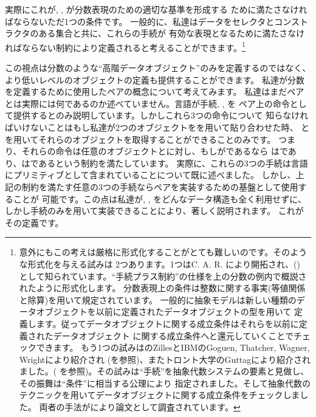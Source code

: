 実際にこれが, , が分数表現のための適切な基準を形成する
ために満たさなければならないただ1つの条件です。
一般的に、私達はデータをセレクタとコンストラクタのある集合と共に、これらの手続が
有効な表現となるために満たさなければならない制約により定義されると考えることができます。\footnote{
意外にもこの考えは厳格に形式化することがとても難しいのです。そのような形式化を与える試みは
2つあります。1つはC. A. R. により開拓され、()
として知られています。``手続プラス制約''の仕様を上の分数の例内で概説されたように形式化します。
分数表現上の条件は整数に関する事実(等値関係と除算)を用いて規定されています。
一般的に抽象モデルは新しい種類のデータオブジェクトを以前に定義されたデータオブジェクトの型を用いて
定義します。従ってデータオブジェクトに関する成立条件はそれらを以前に定義されたデータオブジェクト
に関する成立条件へと還元していくことでチェックできます。
もう1つの試みはのZillesとIBMのGoguen, Thatcher, Wagner, Wrightにより紹介され
(を参照)、またトロント大学のGuttagにより紹介されました。(
を参照)。その試みは``手続''を抽象代数システムの要素と見做し、その振舞は``条件''に相当する公理により
指定されました。そして抽象代数のテクニックを用いてデータオブジェクトに関する成立条件をチェックしました。
両者の手法がにより論文として調査されています。}



この視点は分数のような``高階データオブジェクト''のみを定義するのではなく、
より低いレベルのオブジェクトの定義も提供することができます。
私達が分数を定義するために使用したペアの概念について考えてみます。
私達はまだペアとは実際には何であるのか述べていません。言語が手続, , を
ペア上の命令として提供するとのみ説明しています。しかしこれら3つの命令について
知らなければいけないことはもし私達が2つのオブジェクトをを用いて貼り合わせた時、
とを用いてそれらのオブジェクトを取得することができることのみです。
つまり、それらの命令は任意のオブジェクトとに対し、もしがであるなら
はであり、はであるという制約を満たしています。
実際に、これらの3つの手続は言語にプリミティブとして含まれていることについて既に述べました。
しかし、上記の制約を満たす任意の3つの手続ならペアを実装するための基盤として使用することが
可能です。この点は私達が, , をどんなデータ構造も全く利用せずに、
しかし手続のみを用いて実装できることにより、著しく説明されます。
これがその定義です。

